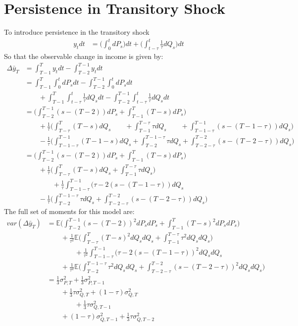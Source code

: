 \section{Persistence in Transitory Shock}
To introduce persistence in the transitory shock
 \begin{align*}
 y_t dt &= \Big(\int_{0}^{t} dP_s \Big) dt +\Big(\int_{t-\tau}^{t} \frac{1}{\tau} dQ_s \Big)dt
 \end{align*}
So that the observable change in income is given by:
\begin{align}
\Delta \bar{y}_T &= \int_{T-1}^{T} y_t dt - \int_{T-2}^{T-1} y_t dt \nonumber \\ 
&= \int_{T-1}^{T} \int_{0}^{t}dP_s dt -\int_{T-2}^{T-1} \int_{0}^{t}dP_s dt \nonumber \\
& \qquad +  \int_{T-1}^{T} \int_{t-\tau}^{t} \frac{1}{\tau} dQ_s dt -\int_{T-2}^{T-1}\int_{t-\tau}^{t} \frac{1}{\tau} dQ_s dt \nonumber \\
&= \Big(\int_{T-2}^{T-1} (s-(T-2))dP_s  + \int_{T-1}^{T} (T-s)dP_s \Big) \nonumber \\
& \qquad +\frac{1}{\tau} \Big(\int_{T-\tau}^{T} (T-s)dQ_s \qquad +\int_{T-1}^{T-\tau} \tau dQ_s \qquad +\int_{T-1-\tau}^{T-1} (s-(T-1-\tau)) dQ_s \Big) \\
& \qquad -\frac{1}{\tau} \Big(\int_{T-1-\tau}^{T-1} (T-1-s)dQ_s +\int_{T-2}^{T-1-\tau} \tau dQ_s +\int_{T-2-\tau}^{T-2} (s-(T-2-\tau)) dQ_s \Big) \nonumber \\
&= \Big(\int_{T-2}^{T-1} (s-(T-2))dP_s  + \int_{T-1}^{T} (T-s)dP_s \Big) \nonumber \\
& \qquad +\frac{1}{\tau} \Big(\int_{T-\tau}^{T} (T-s)dQ_s +\int_{T-1}^{T-\tau} \tau dQ_s\Big) \nonumber\\
& \qquad \qquad +\frac{1}{\tau}\int_{T-1-\tau}^{T-1} (\tau - 2(s-(T-1-\tau)) dQ_s  \nonumber\\
& \qquad -\frac{1}{\tau} \Big(\int_{T-2}^{T-1-\tau} \tau dQ_s +\int_{T-2-\tau}^{T-2} (s-(T-2-\tau)) dQ_s \Big)
\end{align}
The full set of moments for this model are:
\begin{align}
var(\Delta \bar{y}_T) &= \mathbb{E} \Big(\int_{T-2}^{T-1} (s-(T-2))^2 dP_s dP_s  + \int_{T-1}^{T} (T-s)^2 dP_s dP_s \Big) \nonumber \\
& \qquad +\frac{1}{\tau^2} \mathbb{E}\Big(\int_{T-\tau}^{T} (T-s)^2dQ_sdQ_s +\int_{T-1}^{T-\tau} \tau^2 dQ_sdQ_s \Big) \nonumber \\
& \qquad \qquad +\frac{1}{\tau^2}\int_{T-1-\tau}^{T-1} (\tau - 2(s-(T-1-\tau))^2 dQ_s dQ_s  \nonumber\\
& \qquad +\frac{1}{\tau^2} \mathbb{E} \Big(\int_{T-2}^{T-1-\tau} \tau^2 dQ_sdQ_s +\int_{T-2-\tau}^{T-2} (s-(T-2-\tau))^2 dQ_sdQ_s \Big) \nonumber \\
&= \frac{1}{3} \sigma^2_{P,T} + \frac{1}{3} \sigma^2_{P,T-1} \nonumber \\
& \qquad +\frac{1}{3}\tau \sigma^2_{Q,T} + (1-\tau) \sigma^2_{Q,T} \nonumber \\
& \qquad \qquad +\frac{1}{3}\tau \sigma^2_{Q,T-1} \nonumber \\
& \qquad +(1-\tau) \sigma^2_{Q,T-1} + \frac{1}{3}\tau \sigma^2_{Q,T-2}
\end{align}
